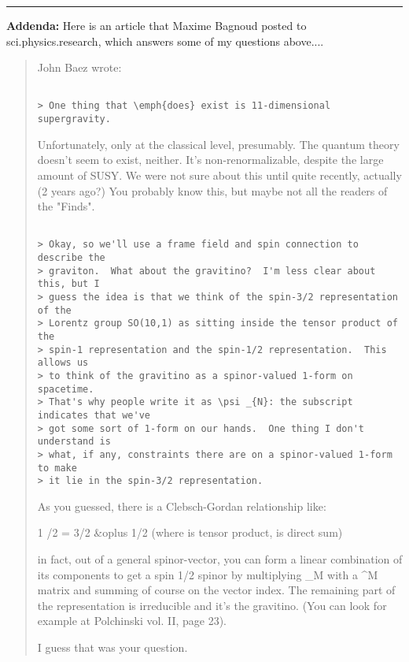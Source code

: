 \par\noindent\rule{\textwidth}{0.4pt}
\textbf{Addenda:}
Here is an article that Maxime Bagnoud posted to sci.physics.research,
which answers some of my questions above....

\begin{quote}

John Baez wrote:

\begin{verbatim}

> One thing that \emph{does} exist is 11-dimensional supergravity.
\end{verbatim}
    

Unfortunately, only at the classical level, presumably. The quantum theory
doesn't seem to exist, neither. It's non-renormalizable, despite the large
amount of SUSY.  We were not sure about this until quite recently, actually 
(2 years ago?) You probably know this, but maybe not all the readers of the
"Finds".


\begin{verbatim}

> Okay, so we'll use a frame field and spin connection to describe the
> graviton.  What about the gravitino?  I'm less clear about this, but I
> guess the idea is that we think of the spin-3/2 representation of the
> Lorentz group SO(10,1) as sitting inside the tensor product of the
> spin-1 representation and the spin-1/2 representation.  This allows us
> to think of the gravitino as a spinor-valued 1-form on spacetime.
> That's why people write it as \psi _{N}: the subscript indicates that we've
> got some sort of 1-form on our hands.  One thing I don't understand is
> what, if any, constraints there are on a spinor-valued 1-form to make
> it lie in the spin-3/2 representation.
\end{verbatim}
    

As you guessed, there is a Clebsch-Gordan relationship like:

1 /2 = 3/2 &oplus 1/2 (where \otimes  is tensor product, \oplus  is direct sum)

in fact, out of a general spinor-vector, you can form a linear combination of
its components to get a spin 1/2 spinor by multiplying \psi _M with a 
\Gamma ^M matrix and summing of course on the vector index. The remaining part 
of the representation is irreducible and it's the gravitino.  (You can look 
for example at Polchinski vol. II, page 23).

I guess that was your question.



\end{quote}

